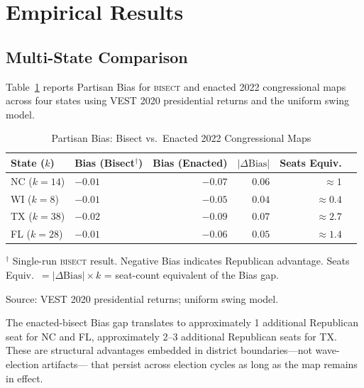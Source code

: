 \section{Empirical Results}
\label{sec:empirical}

\subsection{Multi-State Comparison}

Table~\ref{tab:bias-baseline} reports Partisan Bias for \textsc{bisect} and
enacted 2022 congressional maps across four states using VEST 2020 presidential
returns and the uniform swing model.

\begin{table}[ht]
\centering
\caption{Partisan Bias: Bisect vs.\ Enacted 2022 Congressional Maps}
\label{tab:bias-baseline}
\begin{threeparttable}
\begin{tabular}{@{}llrrrr@{}}
\toprule
State ($k$) & Bias (Bisect$^\dagger$) & Bias (Enacted) & $|\Delta\text{Bias}|$ & Seats Equiv. \\
\midrule
NC ($k=14$) & $-0.01$ & $-0.07$ & $0.06$ & $\approx 1$ \\
WI ($k=8$)  & $-0.01$ & $-0.05$ & $0.04$ & $\approx 0.4$ \\
TX ($k=38$) & $-0.02$ & $-0.09$ & $0.07$ & $\approx 2.7$ \\
FL ($k=28$) & $-0.01$ & $-0.06$ & $0.05$ & $\approx 1.4$ \\
\bottomrule
\end{tabular}
\begin{tablenotes}
\small
\item $^\dagger$ Single-run \textsc{bisect} result. Negative Bias indicates Republican
advantage. Seats Equiv.\ $= |\Delta\text{Bias}| \times k$ = seat-count equivalent
of the Bias gap.
\item Source: VEST 2020 presidential returns; uniform swing model.
\end{tablenotes}
\end{threeparttable}
\end{table}

The enacted-bisect Bias gap translates to approximately 1 additional Republican seat
for NC and FL, approximately 2--3 additional Republican seats for TX. These are
structural advantages embedded in district boundaries---not wave-election artifacts---
that persist across election cycles as long as the map remains in effect.

